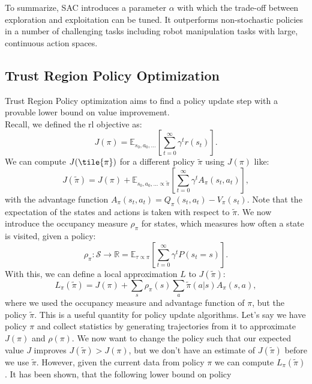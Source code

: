 To summarize, SAC introduces a parameter $\alpha$ with which the trade-off between exploration and exploitation can be tuned. It outperforms non-stochastic 
policies in a number of challenging tasks including robot manipulation tasks with large, continuous action spaces.

\subsection{Trust Region Policy Optimization}
\label{sec:TRPO}
Trust Region Policy optimization \cite{TRPO} aims to find a policy update step with a provable lower bound on value improvement.\\ 
Recall, we defined the \ac{rl} objective as:
\begin{equation}
    J(\pi) = \mathbb{E}_{s_0, a_0, ...}\left[\sum_{t=0}^{\infty}  \gamma^t r(s_t) \right].
\end{equation}
We can compute $J(\tile{\pi})$ for a different policy $\tilde{\pi}$ using $J(\pi)$ like:
\begin{equation}
    J(\tilde{\pi}) = J(\pi) + \mathbb{E}_{s_0, a_0, ... \propto \tilde{\pi}}\left[ \sum_{t=0}^{\infty}  \gamma^t A_{\pi}(s_t, a_t)\right],
\end{equation}
with the advantage function $A_{\pi}(s_t, a_t) = Q_{\pi}(s_t,a_t) - V_{\pi}(s_t)$. Note that the expectation of the states and actions is taken with respect to 
$\tilde{\pi}$. 
We now introduce the occupancy measure $\rho_{\pi}$ for states, which measures how often a state is visited, given a policy:
\begin{equation*}
    \rho_{\pi}:\mathcal{S} \rightarrow \mathbb{R} = \mathbb{E}_{\tau \propto \pi} \left[ \sum_{t=0}^\infty \gamma^t P(s_t=s) \right].
\end{equation*}
With this, we can define a local approximation $L$ to $J(\tilde{\pi})$:
\begin{equation}
    L_{\pi}(\tilde{\pi}) = J(\pi) + \sum_s \rho_{\pi}(s) \sum_a \tilde{\pi}(a|s) A_{\pi}(s,a),
\end{equation}
where we used the occupancy measure and advantage function of $\pi$, but the policy $\tilde{\pi}$. This is a useful quantity for policy update algorithms. 
Let's say we have policy $\pi$ and collect statistics by generating trajectories from it to approximate $J(\pi)$ and $\rho(\pi)$. We now want to change the policy 
such that our expected value $J$ improves $J(\tilde{\pi}) > J(\pi)$, but we don't have an estimate of $J(\tilde{\pi})$ before we use $\tilde{\pi}$. 
However, given the current data from policy $\pi$ we can compute $L_{\pi}(\tilde{\pi})$. It has been shown, that the following lower bound on policy 
